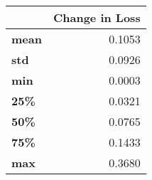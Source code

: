 \begin{tabular}{lr}
\toprule
{} &  Change in Loss \\
\midrule
\textbf{mean} &          0.1053 \\
\textbf{std } &          0.0926 \\
\textbf{min } &          0.0003 \\
\textbf{25\% } &          0.0321 \\
\textbf{50\% } &          0.0765 \\
\textbf{75\% } &          0.1433 \\
\textbf{max } &          0.3680 \\
\bottomrule
\end{tabular}
